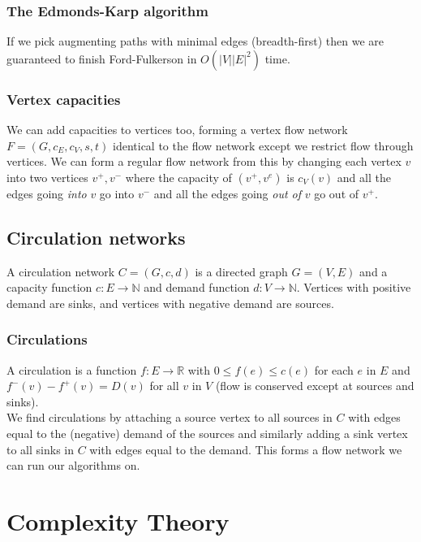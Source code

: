 \documentclass[a4paper, 12pt, twoside]{article}
\begin{document}
\subsubsection{The Edmonds-Karp algorithm}

If we pick augmenting paths with minimal edges (breadth-first) then we are guaranteed to 
finish Ford-Fulkerson in $O(|V||E|^2)$ time.

\subsubsection{Vertex capacities}

We can add capacities to vertices too, forming a vertex flow network 
$F = (G, c_E, c_V, s, t)$ identical to the flow network except we restrict flow through
vertices. We can form a regular flow network from this by changing each vertex $v$
into two vertices $v^+, v^-$ where the capacity of $(v^+, v^e)$ is $c_V(v)$ and
all the edges going \textit{into} $v$ go into $v^-$ and all the edges going
\textit{out of} $v$ go out of $v^+$.

\subsection{Circulation networks}

A circulation network $C = (G, c, d)$ is a directed graph $G = (V, E)$ and a
capacity function $c : E \to \mathbb{N}$ and demand function $d : V \to \mathbb{N}$.
Vertices with positive demand are sinks, and vertices with negative demand are sources.

\subsubsection{Circulations}

A circulation is a function $f : E \to \mathbb{R}$ with $0 \leq f(e) \leq c(e)$ for each
$e$ in $E$ and $f^-(v) - f^+(v) = D(v)$ for all $v$ in $V$ (flow is conserved except at
sources and sinks).
\\[\baselineskip]
We find circulations by attaching a source vertex to all sources in $C$ with edges equal
to the (negative) demand of the sources and similarly adding a sink vertex to all
sinks in $C$ with edges equal to the demand. This forms a flow network we can run our 
algorithms on.

\vfill

\section{Complexity Theory}
\end{document}
